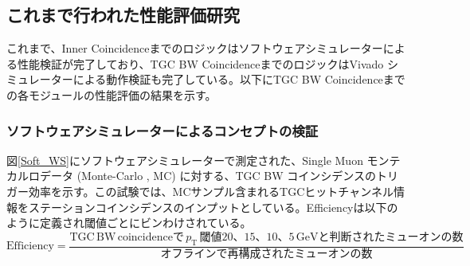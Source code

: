 \subsection{これまで行われた性能評価研究}
これまで、Inner Coincidenceまでのロジックはソフトウェアシミュレーターによる性能検証が完了しており、TGC BW CoincidenceまでのロジックはVivado シミュレーターによる動作検証も完了している。以下にTGC BW Coincidenceまでの各モジュールの性能評価の結果を示す。

\subsubsection*{ソフトウェアシミュレーターによるコンセプトの検証}
図\ref{Soft_WS}にソフトウェアシミュレーターで測定された、Single Muon モンテカルロデータ (Monte-Carlo , MC) に対する、TGC BW コインシデンスのトリガー効率を示す。この試験では、MCサンプル含まれるTGCヒットチャンネル情報をステーションコインシデンスのインプットとしている。Efficiencyは以下のように定義され\pt 閾値ごとにビンわけされている。
\begin{equation}
    \mathrm{Efficiency} = \frac{\mathrm{TGC\,BW\,coincidenceで}\,p_{\mathrm{T}}\,閾値20、15、10、5\,\mathrm{GeV}と判断されたミューオンの数}{オフラインで再構成されたミューオンの数}
\end{equation}

